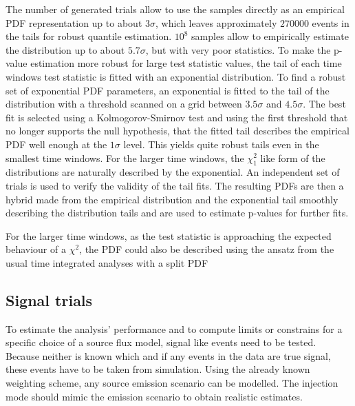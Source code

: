 The number of generated trials allow to use the samples directly as an empirical PDF representation up to about $3\sigma$, which leaves approximately $\num{270000}$ events in the tails for robust quantile estimation.
$10^8$ samples allow to empirically estimate the distribution up to about $5.7\sigma$, but with very poor statistics.
To make the p-value estimation more robust for large test statistic values, the tail of each time windows test statistic is fitted with an exponential distribution.
To find a robust set of exponential PDF parameters, an exponential is fitted to the tail of the distribution with a threshold scanned on a grid between $3.5\sigma$ and $4.5\sigma$.
The best fit is selected using a Kolmogorov-Smirnov test  and using the first threshold that no longer supports the null hypothesis, that the fitted tail describes the empirical PDF well enough at the $1\sigma$ level.
This yields quite robust tails even in the smallest time windows.
For the larger time windows, the $\chi^2_1$ like form of the distributions are naturally described by the exponential.
An independent set of trials is used to verify the validity of the tail fits.
The resulting PDFs are then a hybrid made from the empirical distribution and the exponential tail smoothly describing the distribution tails and are used to estimate p-values for further fits.

For the larger time windows, as the test statistic is approaching the expected behaviour of a $\chi^2$, the PDF could also be described using the ansatz from the usual time integrated analyses with a split PDF

\subsection*{Signal trials}
To estimate the analysis' performance and to compute limits or constrains for a specific choice of a source flux model, signal like events need to be tested.
Because neither is known which and if any events in the data are true signal, these events have to be taken from simulation.
Using the already known weighting scheme, any source emission scenario can be modelled.
The injection mode should mimic the emission scenario to obtain realistic estimates.

